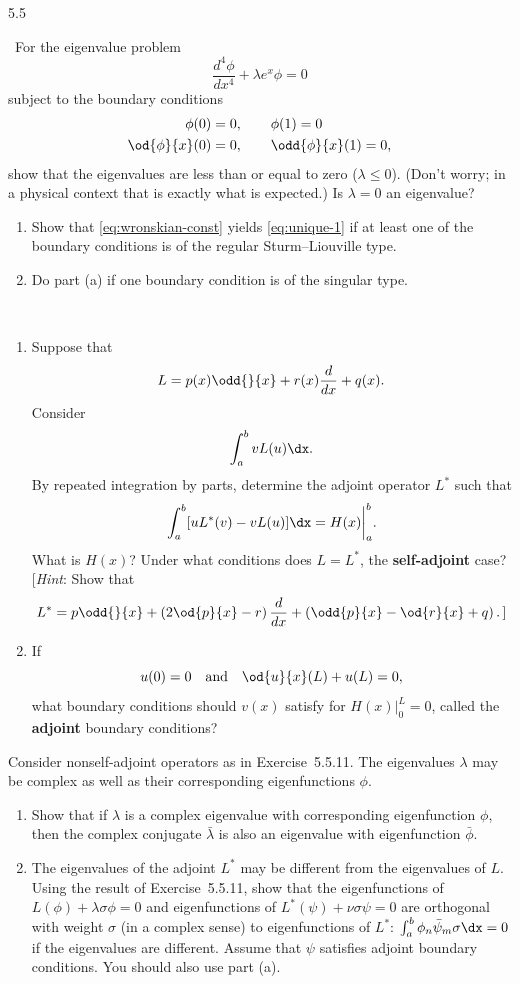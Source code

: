 \begin{exercises}{5.5}
\item\starred\ For the eigenvalue problem
\[
\frac{d^4\phi}{dx^4} + \lambda e^x\phi = 0
\]
subject to the boundary conditions
\begin{align*}
\phi(0) &= 0, \qquad \phi(1) = 0 \\
\od{\phi}{x}(0) &= 0, \qquad \odd{\phi}{x}(1) = 0,
\end{align*}
show that the eigenvalues are less than or equal to zero ($\lambda \le 0$).  (Don't worry; in a physical context that is exactly what is expected.)  Is $\lambda = 0$ an eigenvalue?

\item
\begin{enumerate}
\item Show that \eqref{eq:wronskian-const} yields \eqref{eq:unique-1} if at least one of the boundary conditions is of the regular Sturm--Liouville type.
\item Do part (a) if one boundary condition is of the singular type.
\end{enumerate}

\item\starred\
\begin{enumerate}
\item Suppose that
\[
L = p(x)\odd{}{x} + r(x)\frac{d}{d x} + q(x).
\]
Consider
\[
\int_a^b vL(u)\dx.
\]
By repeated integration by parts, determine the adjoint operator $L^*$ such that
\[
\int_a^b [uL^*(v) - vL(u)]\dx = H(x)\bigg|_a^b.
\]
What is $H(x)$?  Under what conditions does $L = L^*$, the \textbf{self-adjoint} case?  [\textit{Hint}: Show that
\[
L^* = p\odd{}{x} + \left(2\od{p}{x} - r\right)\frac{d}{d x} + \left(\odd{p}{x} - \od{r}{x} + q\right).\,]
\]
\item If
\[
u(0) = 0 \quad \text{and} \quad \od{u}{x}(L) + u(L) = 0,
\]
what boundary conditions should $v(x)$ satisfy for $H(x)|_0^L = 0$, called the \textbf{adjoint} boundary conditions?
\end{enumerate}

\item Consider nonself-adjoint operators as in Exercise~5.5.11.  The eigenvalues $\lambda$ may be complex as well as their corresponding eigenfunctions $\phi$.
\begin{enumerate}
\item Show that if $\lambda$ is a complex eigenvalue with corresponding eigenfunction $\phi$, then the complex conjugate $\bar{\lambda}$ is also an eigenvalue with eigenfunction $\bar{\phi}$.
\item The eigenvalues of the adjoint $L^*$ may be different from the eigenvalues of $L$.  Using the result of Exercise~5.5.11, show that the eigenfunctions of $L(\phi) + \lambda\sigma\phi = 0$ and eigenfunctions of $L^*(\psi) + \nu\sigma\psi = 0$ are orthogonal with weight $\sigma$ (in a complex sense) to eigenfunctions of $L^*$: $\int_a^b \phi_n\bar{\psi}_m\sigma\dx = 0$ if the eigenvalues are different.  Assume that $\psi$ satisfies adjoint boundary conditions.  You should also use part (a).
\end{enumerate}


\end{exercises}
